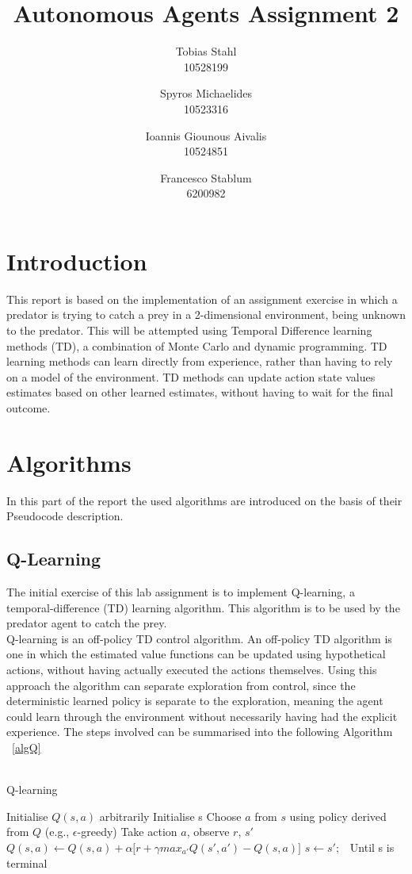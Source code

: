 \documentclass[11pt]{article}
\title{
	\textbf{Autonomous Agents Assignment 2}
}
\author{Tobias Stahl \\ 10528199 \and Spyros Michaelides \\ 10523316 \and Ioannis Giounous Aivalis \\ 10524851 \and Francesco Stablum \\ 6200982}
\begin{document}
\maketitle


\section{Introduction}
This report is based on the implementation of an assignment exercise in which a predator is trying to catch a prey in a 2-dimensional environment, being unknown to the predator. This will be attempted  using Temporal Difference learning methods (TD), a combination of Monte Carlo and dynamic programming. TD learning methods can learn directly from experience, rather than having to rely on a model of the environment. TD methods can update action state values estimates based on other learned estimates, without having to wait for the final outcome. 

\section{Algorithms}
In this part of the report the used algorithms are introduced on the basis of their Pseudocode description.


\subsection{Q-Learning}
The initial exercise of this lab assignment is to implement Q-learning, a temporal-difference (TD) learning algorithm. This algorithm is to be used by the predator agent to catch the prey.\\
Q-learning is an off-policy TD control algorithm. An off-policy TD algorithm is one in which the estimated value functions can be updated using hypothetical actions, without having actually executed the actions themselves. Using this approach the algorithm can separate exploration from control, since the deterministic learned policy is separate to the exploration, meaning the agent could learn through the environment without necessarily having had the explicit experience.
The steps involved can be summarised into the following Algorithm ~\ref{algQ}\\\\


\begin{algorithm}
\caption{Q-learning}
\begin{algorithmic}[1]
\label{algQ}
\STATE Initialise $Q(s,a)$ arbitrarily
\STATE Initialise s
\STATE Choose $a$ from $s$ using policy derived from $Q$ (e.g., $\epsilon$-greedy)
\STATE Take action $a$, observe $r$, $s'$
\STATE $Q(s,a) \leftarrow Q(s,a) + \alpha \lbrack r + \gamma max_{a'} Q(s',a') - Q(s,a)\rbrack$
\STATE $s \leftarrow s';$\
\ENDFOR
\STATE Until s is terminal
\ENDFOR
\end{algorithmic}
\end{algorithm}
\end{document}
